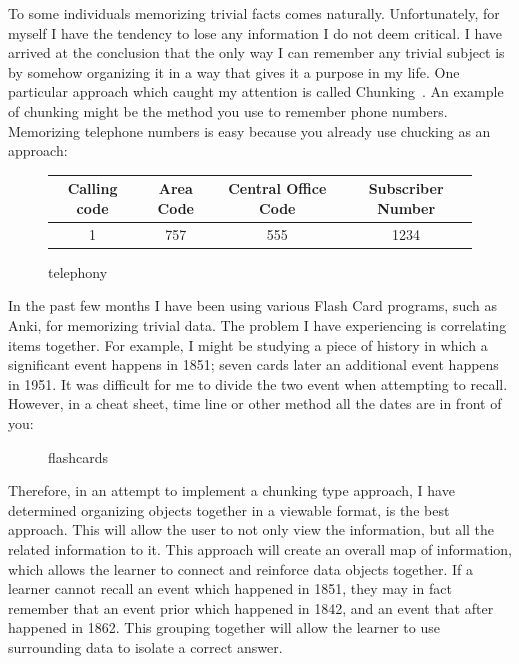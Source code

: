 \documentclass[fontsize=11pt, %
paper=a4, %
twoside, %
captions=tableheading,
index=totoc,
hyperref]{labbook}
\begin{document}
\labday{\today}
\begin{onehalfspace}
To some individuals memorizing trivial facts comes naturally. Unfortunately, for myself I have the tendency to lose any information I do not deem critical. I have arrived at the conclusion that the only way I can remember any trivial subject is by somehow organizing it in a way that gives it a purpose in my life. One particular approach which caught my attention is called Chunking~\citep{bor2012the}. An example of chunking might be the method you use to remember phone numbers. Memorizing telephone numbers is easy because you already use chucking as an approach:\\
\end{onehalfspace}
\begin{figure}[H]
\centering
\begin{tabular}{|c|c|c|c|}\hline
Calling code & Area Code & Central Office Code & Subscriber Number\\\hline
1 & 757 & 555 & 1234\\\hline
\end{tabular}
\caption{telephony}
\end{figure}
\begin{onehalfspace}
In the past few months I have been using various Flash Card programs, such as Anki, for memorizing trivial data. The problem I have experiencing is correlating items together. For example, I might be studying a piece of history in which a significant event happens in 1851; seven cards later an additional event happens in 1951. It was difficult for me to divide the two event when attempting to recall. However, in a cheat sheet, time line or other method all the dates are in front of you:
\end{onehalfspace}
\begin{figure}[H]
\centering
{}
\caption{flashcards}
\end{figure}
\begin{onehalfspace}
Therefore, in an attempt to implement a chunking type approach, I have determined organizing objects together in a viewable format, is the best approach. This will allow the user to not only view the information, but all the related information to it. This approach will create an overall map of information, which allows the learner to connect and reinforce data objects together. If a learner cannot recall an event which happened in 1851, they may in fact remember that an event prior which happened in 1842, and an event that after happened in 1862. This grouping together will allow the learner to use surrounding data to isolate a correct answer. 
\end{onehalfspace}
\end{document}
